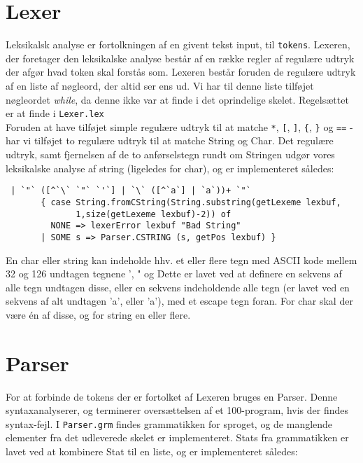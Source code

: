 \documentclass[12pt]{article}
\begin{document}
\section{Lexer}
Leksikalsk analyse er fortolkningen af en givent tekst input, til
\texttt{tokens}. Lexeren, der foretager den leksikalske analyse består af en
række regler af regulære udtryk der afgør hvad token skal forstås som. Lexeren
består foruden de regulære udtryk af en liste af nøgleord, der altid ser ens ud.
Vi har til denne liste tilføjet nøgleordet \textit{while}, da denne ikke var at
finde i det oprindelige skelet. Regelsættet er at finde i \texttt{Lexer.lex}\\
Foruden at have tilføjet simple regulære udtryk til at matche \texttt{*},
\texttt{[}, \texttt{]}, \texttt{\{}, \texttt{\}} og \texttt{==} - har vi
tilføjet to regulære udtryk til at matche String og Char. Det regulære udtryk,
samt fjernelsen af de to anførselstegn rundt om Stringen udgør vores leksikalske
analyse af string (ligeledes for char), og er implementeret således:\\

\begin{verbatim}
 | `"` ([^`\` `"` `'`] | `\` ([^`a`] | `a`))+ `"`
       { case String.fromCString(String.substring(getLexeme lexbuf,
              1,size(getLexeme lexbuf)-2)) of
         NONE => lexerError lexbuf "Bad String"
       | SOME s => Parser.CSTRING (s, getPos lexbuf) }
\end{verbatim}	 
    
En char eller string kan indeholde hhv. et eller flere tegn med ASCII kode
mellem 32 og 126 undtagen tegnene ’, " og \. Dette er lavet ved at definere en
sekvens af alle tegn undtagen disse, eller en sekvens indeholdende alle tegn (er
lavet ved en sekvens af alt undtagen 'a', eller 'a'), med et escape tegn foran.
For char skal der være én af disse, og for string en eller flere.
    
    
\section{Parser}
For at forbinde de tokens der er fortolket af Lexeren bruges en Parser. Denne
syntaxanalyserer, og terminerer oversættelsen af et 100-program, hvis der findes
syntax-fejl. I \texttt{Parser.grm} findes grammatikken for sproget, og de
manglende elementer fra det udleverede skelet er implementeret. Stats fra
grammatikken er lavet ved at kombinere Stat til en liste, og er implementeret
således:\\
\end{document}
